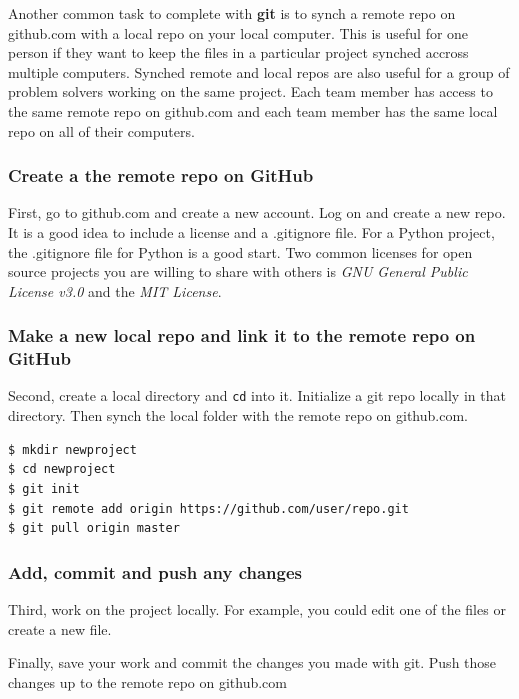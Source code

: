 \documentclass{book}
\begin{document}
    
        Another common task to complete with \textbf{git} is to synch a remote
repo on github.com with a local repo on your local computer. This is
useful for one person if they want to keep the files in a particular
project synched accross multiple computers. Synched remote and local
repos are also useful for a group of problem solvers working on the same
project. Each team member has access to the same remote repo on
github.com and each team member has the same local repo on all of their
computers.

\subsubsection{Create a the remote repo on
GitHub}\label{create-a-the-remote-repo-on-github}

First, go to github.com and create a new account. Log on and create a
new repo. It is a good idea to include a license and a .gitignore file.
For a Python project, the .gitignore file for Python is a good start.
Two common licenses for open source projects you are willing to share
with others is \emph{GNU General Public License v3.0} and the \emph{MIT
License}.

\subsubsection{Make a new local repo and link it to the remote repo on
GitHub}\label{make-a-new-local-repo-and-link-it-to-the-remote-repo-on-github}

Second, create a local directory and \lstinline!cd! into it. Initialize
a git repo locally in that directory. Then synch the local folder with
the remote repo on github.com.

\begin{lstlisting}
$ mkdir newproject
$ cd newproject
$ git init
$ git remote add origin https://github.com/user/repo.git
$ git pull origin master
\end{lstlisting}

\subsubsection{Add, commit and push any
changes}\label{add-commit-and-push-any-changes}

Third, work on the project locally. For example, you could edit one of
the files or create a new file.

Finally, save your work and commit the changes you made with git. Push
those changes up to the remote repo on github.com
\end{document}
